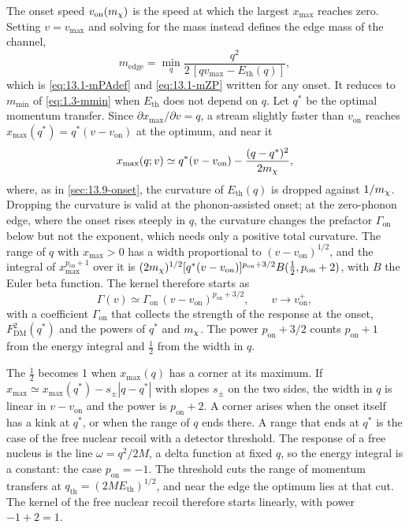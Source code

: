 The onset speed $v_{\mathrm{on}}(m_{\chi})$ is the speed at which the largest $x_{\mathrm{max}}$ reaches zero. Setting $v = v_{\mathrm{max}}$ and solving for the mass instead defines the edge mass of the channel,
\begin{equation}
  m_{\mathrm{edge}} = \min_q \frac{q^2}{2\,[qv_{\mathrm{max}} - E_{\mathrm{th}}(q)]} ,
  \label{eq:21.3-medge}
\end{equation}
which is \cref{eq:13.1-mPAdef} and \cref{eq:13.1-mZP} written for any onset. It reduces to $m_{\mathrm{min}}$ of \cref{eq:1.3-mmin} when $E_{\mathrm{th}}$ does not depend on $q$. Let $q^*$ be the optimal momentum transfer. Since $\partial x_{\mathrm{max}}/\partial v = q$, a stream slightly faster than $v_{\mathrm{on}}$ reaches $x_{\mathrm{max}}(q^*) = q^*(v - v_{\mathrm{on}})$ at the optimum, and near it
\begin{equation*}
  x_{\mathrm{max}}(q; v) \simeq q^*(v - v_{\mathrm{on}}) - \frac{(q - q^*)^2}{2m_{\chi}} ,
\end{equation*}
where, as in \cref{sec:13.9-onset}, the curvature of $E_{\mathrm{th}}(q)$ is dropped against $1/m_{\chi}$. Dropping the curvature is valid at the phonon-assisted onset; at the zero-phonon edge, where the onset rises steeply in $q$, the curvature changes the prefactor $\varGamma_{\mathrm{on}}$ below but not the exponent, which needs only a positive total curvature. The range of $q$ with $x_{\mathrm{max}} > 0$ has a width proportional to $(v - v_{\mathrm{on}})^{1/2}$, and the integral of $x_{\mathrm{max}}^{p_{\mathrm{on}}+1}$ over it is $(2m_{\chi})^{1/2}[q^*(v - v_{\mathrm{on}})]^{p_{\mathrm{on}}+3/2}B(\tfrac12, p_{\mathrm{on}}+2)$, with $B$ the Euler beta function. The kernel therefore starts as
\begin{equation}
  \varGamma(v) \simeq \varGamma_{\mathrm{on}}\,(v - v_{\mathrm{on}})^{p_{\mathrm{on}} + 3/2} , \qquad v \to v_{\mathrm{on}}^+ ,
  \label{eq:21.3-kernel}
\end{equation}
with a coefficient $\varGamma_{\mathrm{on}}$ that collects the strength of the response at the onset, $F_{\mathrm{DM}}^2(q^*)$ and the powers of $q^*$ and $m_{\chi}$. The power $p_{\mathrm{on}} + 3/2$ counts $p_{\mathrm{on}} + 1$ from the energy integral and $\tfrac12$ from the width in $q$.

The $\tfrac12$ becomes 1 when $x_{\mathrm{max}}(q)$ has a corner at its maximum. If $x_{\mathrm{max}} \simeq x_{\mathrm{max}}(q^*) - s_\pm|q - q^*|$ with slopes $s_\pm$ on the two sides, the width in $q$ is linear in $v - v_{\mathrm{on}}$ and the power is $p_{\mathrm{on}} + 2$. A corner arises when the onset itself has a kink at $q^*$, or when the range of $q$ ends there. A range that ends at $q^*$ is the case of the free nuclear recoil with a detector threshold. The response of a free nucleus is the line $\omega = q^2/2M$, a delta function at fixed $q$, so the energy integral is a constant: the case $p_{\mathrm{on}} = -1$. The threshold cuts the range of momentum transfers at $q_{\mathrm{th}} = (2ME_{\mathrm{th}})^{1/2}$, and near the edge the optimum lies at that cut. The kernel of the free nuclear recoil therefore starts linearly, with power $-1 + 2 = 1$.

